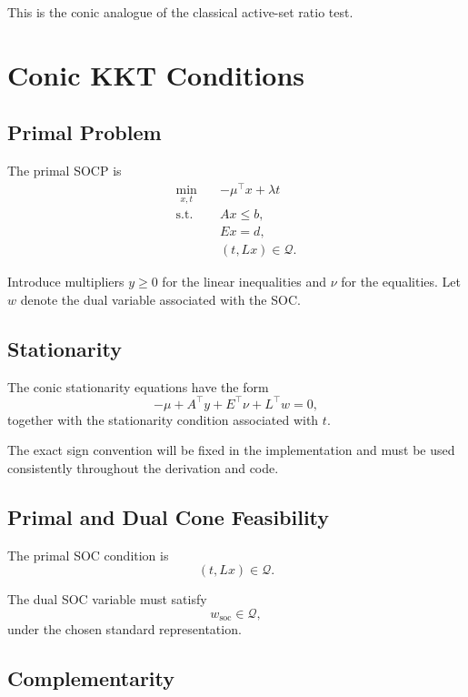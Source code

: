 \documentclass[11pt,a4paper]{article}
\begin{document}
This is the conic analogue of the classical active-set ratio test.

\section{Conic KKT Conditions}

\subsection{Primal Problem}

The primal SOCP is
\begin{equation}
\begin{aligned}
\min_{x,t}\quad&
-\mu^\top x+\lambda t\\
\text{s.t.}\quad&
Ax\leq b,\\
&Ex=d,\\
&(t,Lx)\in\mathcal Q.
\end{aligned}
\tag{7}
\end{equation}

Introduce multipliers $y\geq0$ for the linear inequalities and
$\nu$ for the equalities. Let $w$ denote the dual variable associated
with the SOC.

\subsection{Stationarity}

The conic stationarity equations have the form
\[
-\mu+A^\top y+E^\top\nu+L^\top w=0,
\]
together with the stationarity condition associated with $t$.

The exact sign convention will be fixed in the implementation and
must be used consistently throughout the derivation and code.

\subsection{Primal and Dual Cone Feasibility}

The primal SOC condition is
\[
(t,Lx)\in\mathcal Q.
\]

The dual SOC variable must satisfy
\[
w_{\mathrm{soc}}\in\mathcal Q,
\]
under the chosen standard representation.

\subsection{Complementarity}
\end{document}
